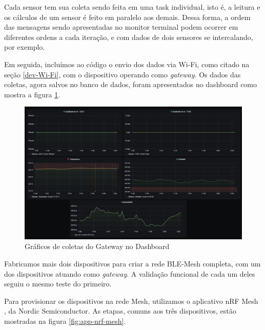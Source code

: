 \documentclass[../monografia.tex]{subfiles}
\begin{document}
Cada sensor tem sua coleta sendo feita em uma task individual, isto é, a leitura e os cálculos de um sensor é feito em paralelo aos demais. Dessa forma, a ordem das mensagens sendo apresentadas no monitor terminal podem ocorrer em diferentes ordens a cada iteração, e com dados de dois sensores se intercalando, por exemplo. \newpage

Em seguida, incluímos ao código o envio dos dados via Wi-Fi, como citado na seção \ref{dev-Wi-Fi}, com o dispositivo operando como \textit{gateway}. Os dados das coletas, agora salvos no banco de dados, foram apresentados no dashboard como mostra a figura \ref{fig:dashboard-graphs}.

\begin{figure}[h]
	\centering
	\includegraphics[width=\textwidth]{dashboard-graphs}
	\caption{Gráficos de coletas do Gateway no Dashboard}
	\label{fig:dashboard-graphs}
\end{figure}

Fabricamos mais dois dispositivos para criar a rede BLE-Mesh completa, com um dos dispositivos atuando como \textit{gateway}. A validação funcional de cada um deles seguiu o mesmo teste do primeiro.  

Para provisionar os dispositivos na rede Mesh, utilizamos o aplicativo nRF Mesh \cite{nrf-app}, da Nordic Semiconductor. As etapas, comuns aos três dispositivos, estão mostradas na figura \ref{fig:app-nrf-mesh}.
\end{document}
